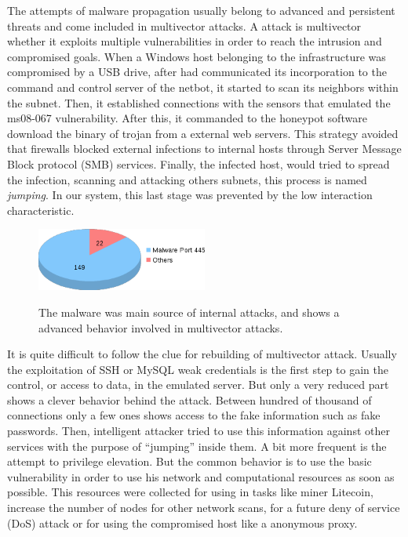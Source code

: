 \documentclass[a4paper]{llncs}
\begin{document}
The attempts of malware propagation usually belong to advanced and persistent threats and come included in multivector attacks. A attack is multivector whether it exploits multiple vulnerabilities in order to reach the intrusion and compromised goals. When a Windows host belonging to the infrastructure was compromised by a USB drive, after had communicated its incorporation to the command and control server of the netbot, it started to scan its neighbors within the subnet. Then, it established connections with the sensors that  emulated the ms08-067\cite{ms08067} vulnerability. After this, it commanded to the honeypot software download the binary of trojan from a external web servers. This strategy avoided that firewalls blocked external infections to internal hosts through Server Message Block protocol (SMB) services. Finally, the infected host, would tried to spread the infection, scanning and attacking others subnets, this process is named {\it jumping}. In our system, this last stage was prevented by the low interaction characteristic.

\begin{figure}[h]
	\includegraphics[width=0.5\textwidth]{internalTypes.png}
	\centering
	\label{fig:internalTypes}
	\caption{The malware was main source of internal attacks, and shows a advanced behavior involved in multivector attacks.}
\end{figure}

It is quite difficult to follow the clue for rebuilding of multivector attack. Usually the exploitation of SSH or MySQL weak credentials is the first step to gain the control, or access to data, in the emulated server. But only a very reduced part shows a clever behavior behind the attack. Between hundred of thousand of connections only a few ones shows access to the fake information such as fake passwords. Then, intelligent attacker tried to use this information against other services with the purpose of  ``jumping'' inside them. A bit more frequent is the attempt to privilege elevation. But the common behavior is to use the basic vulnerability in order to use his network and computational resources as soon as possible. This resources were collected for using in tasks like miner Litecoin\cite{litecoin}, increase the number of nodes for other network scans, for a future deny of service (DoS) attack or for using the compromised host like a anonymous proxy.
\end{document}
